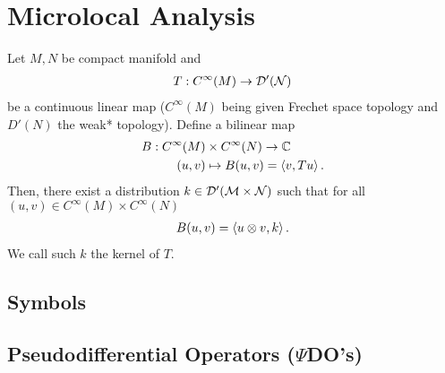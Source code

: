 \documentclass{article}
\title{}
\date{}
\begin{document}
\section{Microlocal Analysis}
\begin{ftheorem} Let $M, N$ be compact manifold and 
\begin{align*}
T: C^\infty(M) \to \D'(N) \\
\end{align*}
be a continuous linear map ($C^\infty(M)$ being given Frechet space topology and $D'(N)$ the weak* topology). Define a bilinear map 
\begin{align*}
B: C^\infty(M) &\times C^\infty(N) \to \C \\
(u, v) &\mapsto B(u, v) = \inprod[v, Tu]. 
\end{align*}
Then, there exist a distribution $k \in \D'(M \times N)$ such that for all $(u, v) \in C^\infty(M) \times C^\infty(N)$
\begin{align*}
B(u, v) = \inprod[u \otimes v, k]. 
\end{align*}
We call such $k$ the kernel of $T$. 
\end{ftheorem}



\subsection{Symbols}

\subsection{Pseudodifferential Operators ($\Psi$DO's)}


\end{document}
